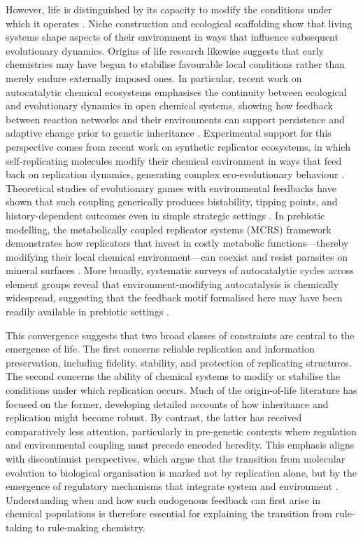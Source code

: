 \documentclass[11pt]{article}
\newcommand{\rev}[1]{#1}
\begin{document}
However, life is distinguished by its capacity to modify the conditions under which it operates \cite{OdlingSmee2003}. Niche construction \cite{Laland1999Niche} and ecological scaffolding \cite{Black2020} show that living systems shape aspects of their environment in ways that influence subsequent evolutionary dynamics. Origins of life research likewise suggests that early chemistries may have begun to stabilise favourable local conditions rather than merely endure externally imposed ones. In particular, recent work on autocatalytic chemical ecosystems emphasises the continuity between ecological and evolutionary dynamics in open chemical systems, showing how feedback between reaction networks and their environments can support persistence and adaptive change prior to genetic inheritance \cite{Baum2023Continuum,Kalambokidis2024EcoEvo}. \rev{Experimental support for this perspective comes from recent work on synthetic replicator ecosystems, in which self-replicating molecules modify their chemical environment in ways that feed back on replication dynamics, generating complex eco-evolutionary behaviour \citep{Liu2024Otto}. Theoretical studies of evolutionary games with environmental feedbacks have shown that such coupling generically produces bistability, tipping points, and history-dependent outcomes even in simple strategic settings \citep{Tilman2020}. In prebiotic modelling, the metabolically coupled replicator systems (MCRS) framework demonstrates how replicators that invest in costly metabolic functions---thereby modifying their local chemical environment---can coexist and resist parasites on mineral surfaces \citep{Czaran2015MCRS,Adamski2020}. More broadly, systematic surveys of autocatalytic cycles across element groups reveal that environment-modifying autocatalysis is chemically widespread, suggesting that the feedback motif formalised here may have been readily available in prebiotic settings \citep{Peng2023Autocatalysis}.}

This convergence suggests that two broad classes of constraints are central to the emergence of life. The first concerns reliable replication and information preservation, including fidelity, stability, and protection of replicating structures. The second concerns the ability of chemical systems to modify or stabilise the conditions under which replication occurs. Much of the origin-of-life literature has focused on the former, developing detailed accounts of how inheritance and replication might become robust. By contrast, the latter has received comparatively less attention, particularly in pre-genetic contexts where regulation and environmental coupling must precede encoded heredity. This emphasis aligns with discontinuist perspectives, which argue that the transition from molecular evolution to biological organisation is marked not by replication alone, but by the emergence of regulatory mechanisms that integrate system and environment \cite{BichDamiano2012Emergence}. Understanding when and how such endogenous feedback can first arise in chemical populations is therefore essential for explaining the transition from rule-taking to rule-making chemistry.
\end{document}
